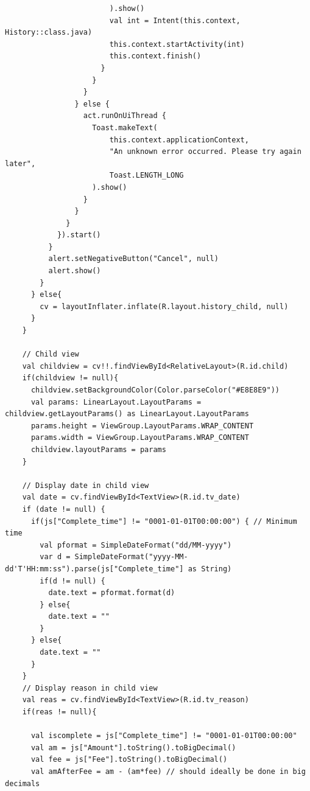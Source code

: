 \documentclass[11pt, a4paper]{article}
\begin{document}
\begin{appendices}
\begin{lstlisting}
                        ).show()
                        val int = Intent(this.context, History::class.java)
                        this.context.startActivity(int)
                        this.context.finish()
                      }
                    }
                  }
                } else {
                  act.runOnUiThread {
                    Toast.makeText(
                        this.context.applicationContext,
                        "An unknown error occurred. Please try again later",
                        Toast.LENGTH_LONG
                    ).show()
                  }
                }
              }
            }).start()
          }
          alert.setNegativeButton("Cancel", null)
          alert.show()
        }
      } else{
        cv = layoutInflater.inflate(R.layout.history_child, null)
      }
    }

    // Child view
    val childview = cv!!.findViewById<RelativeLayout>(R.id.child)
    if(childview != null){
      childview.setBackgroundColor(Color.parseColor("#E8E8E9"))
      val params: LinearLayout.LayoutParams = childview.getLayoutParams() as LinearLayout.LayoutParams
      params.height = ViewGroup.LayoutParams.WRAP_CONTENT
      params.width = ViewGroup.LayoutParams.WRAP_CONTENT
      childview.layoutParams = params
    }

    // Display date in child view
    val date = cv.findViewById<TextView>(R.id.tv_date)
    if (date != null) {
      if(js["Complete_time"] != "0001-01-01T00:00:00") { // Minimum time
        val pformat = SimpleDateFormat("dd/MM-yyyy")
        var d = SimpleDateFormat("yyyy-MM-dd'T'HH:mm:ss").parse(js["Complete_time"] as String)
        if(d != null) {
          date.text = pformat.format(d)
        } else{
          date.text = ""
        }
      } else{
        date.text = ""
      }
    }
    // Display reason in child view
    val reas = cv.findViewById<TextView>(R.id.tv_reason)
    if(reas != null){

      val iscomplete = js["Complete_time"] != "0001-01-01T00:00:00"
      val am = js["Amount"].toString().toBigDecimal()
      val fee = js["Fee"].toString().toBigDecimal()
      val amAfterFee = am - (am*fee) // should ideally be done in big decimals


\end{lstlisting}
\end{appendices}
\end{document}
